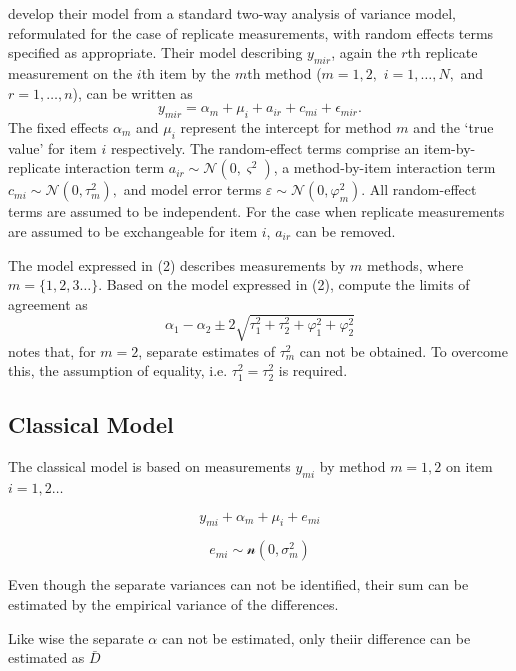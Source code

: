 \documentclass[12pt, a4paper]{report}
\theoremstyle{plain}
\theoremstyle{definition}
\theoremstyle{remark}
\begin{document}
\citet{BXC2008} develop their model from a standard two-way analysis of variance model, reformulated for the case of replicate measurements, with random effects terms specified as appropriate. 
Their model describing $y_{mir} $, again the $r$th replicate measurement on the $i$th item by the $m$th method ($m=1,2,$ $i=1,\ldots,N,$ and $r = 1,\ldots,n$), can be written as
\begin{equation}\label{BXC-model}
y_{mir}  = \alpha_{m} + \mu_{i} + a_{ir} + c_{mi} + \epsilon_{mir}.
\end{equation}
The fixed effects $\alpha_{m}$ and $\mu_{i}$  represent the intercept for method $m$ and the `true value' for item $i$ respectively. The random-effect terms comprise an item-by-replicate interaction term $a_{ir} \sim \mathcal{N}(0,\varsigma^{2})$, a method-by-item interaction term $c_{mi} \sim \mathcal{N}(0,\tau^{2}_{m}),$ and model error terms $\varepsilon \sim \mathcal{N}(0,\varphi^{2}_{m}).$ All random-effect terms are assumed to be independent.
For the case when replicate measurements are assumed to be exchangeable for item $i$, $a_{ir}$ can be removed.

The model expressed in (2) describes measurements by $m$ methods, where $m = \{1,2,3\ldots\}$. Based on the model expressed in (2), \citet{BXC2008} compute the limits of agreement as
\[
\alpha_1 - \alpha_2 \pm 2 \sqrt{ \tau^2_1 +  \tau^2_2 +  \varphi^2_1 +  \varphi^2_2 }
\]
\citet{BXC2008} notes that, for $m=2$,  separate estimates of $\tau^2_m$ can not be obtained. To overcome this, the assumption of equality, i.e. $\tau^2_1 = \tau^2_2$ is required.




\subsection{Classical Model}
The classical model is based on measurements $y_{mi}$
by method $m=1,2$ on item $i = 1,2 \ldots$

\[y_{mi} + \alpha_{m} + \mu_{i} + e_{mi}\]

\[e_{mi} \sim \mathcal{n} (0,\sigma^2_m)\]

Even though the separate variances can not be
identified, their sum can be estimated by the empirical variance of the differences.

Like wise the separate $\alpha$ can not be
estimated, only theiir difference can be estimated as
$\bar{D}$
\end{document}
